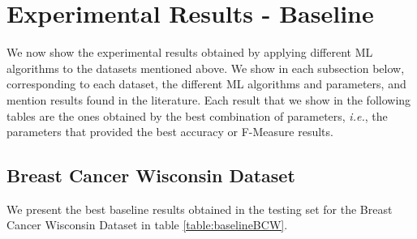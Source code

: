 \section{Experimental Results - Baseline}
\label{ssec:ExperimentalResultsBaseline}


We now show the experimental results obtained by applying different \ac{ML} algorithms to the datasets mentioned above. We show in each subsection below, corresponding to each dataset, the different \ac{ML} algorithms and parameters, and mention results found in the literature. Each result that we show in the following tables are the ones obtained by the best combination of parameters, \textit{i.e.}, the parameters that provided the best accuracy or F-Measure results.

\subsection{Breast Cancer Wisconsin Dataset}

We present the best baseline results obtained in the testing set for the Breast Cancer Wisconsin Dataset in table \ref{table:baselineBCW}.

